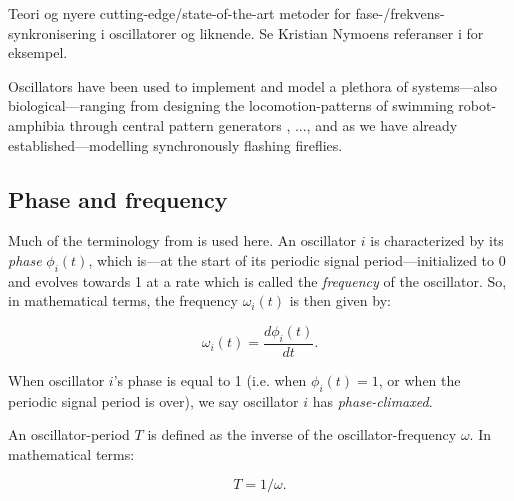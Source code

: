 	
	
	Teori og nyere cutting-edge/state-of-the-art metoder for fase-/frekvens-synkronisering i oscillatorer og liknende. Se Kristian Nymoens referanser i \cite{nymoen_synch} for eksempel. \nl
	
	Oscillators have been used to implement and model a plethora of systems—also biological—ranging from designing the locomotion-patterns of swimming robot-amphibia through central pattern generators \cite{ijspeert_cpg}, ..., and as we have already established—modelling synchronously flashing fireflies.
	
	\subsection{Phase and frequency}
	
	Much of the terminology from \cite{nymoen_synch} is used here. An oscillator $i$ is characterized by its \textit{phase} $\phi_i(t)$, which is—at the start of its periodic signal period—initialized to 0 and evolves towards 1 at a rate which is called the \textit{frequency} of the oscillator. So, in mathematical terms, the frequency $\omega_i(t)$ is then given by:
	
	\begin{equation}
	\label{phase_freq}
		\omega_i(t) = \frac{d \phi_i(t)}{d t} .
	\end{equation}

	When oscillator $i$'s phase is equal to 1 (i.e. when $\phi_i(t)=1$, or when the periodic signal period is over), we say oscillator $i$ has \textit{phase-climaxed}.
	
	An oscillator-period $T$ is defined as the inverse of the oscillator-frequency $\omega$. In mathematical terms:
	
	\begin{equation}
	\label{period_freq}
		T = 1/\omega .
	\end{equation}
	
